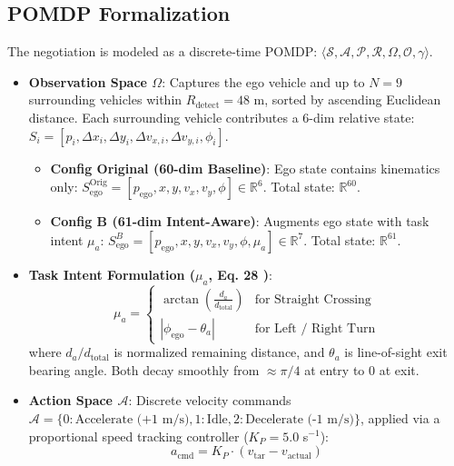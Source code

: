 \documentclass[journal]{IEEEtran}
\begin{document}
\subsection{POMDP Formalization}
The negotiation is modeled as a discrete-time POMDP: $\langle \mathcal{S}, \mathcal{A}, \mathcal{P}, \mathcal{R}, \Omega, \mathcal{O}, \gamma \rangle$.
\begin{itemize}
    \item \textbf{Observation Space $\Omega$}: Captures the ego vehicle and up to $N = 9$ surrounding vehicles within $R_{\text{detect}} = 48$ m, sorted by ascending Euclidean distance. Each surrounding vehicle contributes a 6-dim relative state: $S_i = [p_i, \Delta x_i, \Delta y_i, \Delta v_{x,i}, \Delta v_{y,i}, \phi_i]$.
    \begin{itemize}
        \item \textbf{Config Original (60-dim Baseline)}: Ego state contains kinematics only: $S_{\text{ego}}^{\text{Orig}} = [p_{\text{ego}}, x, y, v_x, v_y, \phi] \in \mathbb{R}^6$. Total state: $\mathbb{R}^{60}$.
        \item \textbf{Config B (61-dim Intent-Aware)}: Augments ego state with task intent $\mu_a$: $S_{\text{ego}}^{B} = [p_{\text{ego}}, x, y, v_x, v_y, \phi, \mu_a] \in \mathbb{R}^7$. Total state: $\mathbb{R}^{61}$.
    \end{itemize}
    \item \textbf{Task Intent Formulation ($\mu_a$, Eq. 28 \cite{xiao2024decision})}:
    \begin{equation}
        \mu_a = \begin{cases}
            \arctan\left(\frac{d_a}{d_{\text{total}}}\right) & \text{for Straight Crossing} \\
            |\phi_{\text{ego}} - \theta_a| & \text{for Left / Right Turn}
        \end{cases}
    \end{equation}
    where $d_a / d_{\text{total}}$ is normalized remaining distance, and $\theta_a$ is line-of-sight exit bearing angle. Both decay smoothly from $\approx \pi/4$ at entry to $0$ at exit.
    \item \textbf{Action Space $\mathcal{A}$}: Discrete velocity commands $\mathcal{A} = \{0: \text{Accelerate (+1 m/s)}, 1: \text{Idle}, 2: \text{Decelerate (-1 m/s)}\}$, applied via a proportional speed tracking controller ($K_P = 5.0$ s$^{-1}$):
    \begin{equation}
        a_{\text{cmd}} = K_P \cdot (v_{\text{tar}} - v_{\text{actual}})
    \end{equation}

\end{itemize}
\end{document}
